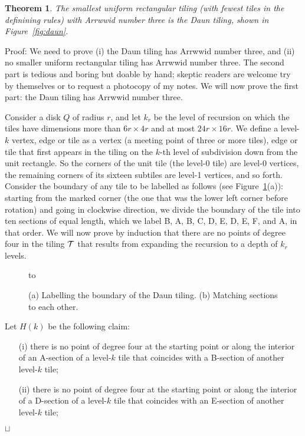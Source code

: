 \documentclass[11pt,a4paper]{article}
\newtheorem{theorem}{Theorem}
\newenvironment{proof}{Proof:}{\qed}
\def\squareforqed{\hbox{\rlap{$\sqcap$}$\sqcup$}}
\def\qed{\ifmmode\squareforqed\else{\unskip\nobreak\hfil
\penalty50\hskip1em\null\nobreak\hfil\squareforqed
\parfillskip=0pt\finalhyphendemerits=0\endgraf}\fi}
\begin{document}
\begin{theorem}\label{th:Dauntiling}
The smallest uniform rectangular tiling (with fewest tiles in the definining rules) with Arrwwid number three is the Daun tiling, shown in Figure~\ref{fig:daun}.
\end{theorem}
\begin{proof}
We need to prove (i) the Daun tiling has Arrwwid number three, and (ii) no smaller uniform rectangular tiling has Arrwwid number three. The second part is tedious and boring but doable by hand; skeptic readers are welcome try by themselves or to request a photocopy of my notes. We will now prove the first part: the Daun tiling has Arrwwid number three.

Consider a disk $Q$ of radius $r$, and let $k_r$ be the level of recursion on which the tiles have dimensions more than $6r \times 4r$ and at most $24r \times 16r$. We define a level-$k$ vertex, edge or tile as a vertex (a meeting point of three or more tiles), edge or tile that first appears in the tiling on the $k$-th level of subdivision down from the unit rectangle. So the corners of the unit tile (the level-0 tile) are level-0 vertices, the remaining corners of its sixteen subtiles are level-1 vertices, and so forth. Consider the boundary of any tile to be labelled as follows (see Figure~\ref{fig:daun-labelling}(a)): starting from the marked corner (the one that was the lower left corner before rotation) and going in clockwise direction, we divide the boundary of the tile into ten sections of equal length, which we label B, A, B, C, D, E, D, E, F, and A, in that order. We will now prove by induction that there are no points of degree four in the tiling ${\cal T}$ that results from expanding the recursion to a depth of $k_r$ levels.
\begin{figure}
\centering
\hbox to
\caption{(a) Labelling the boundary of the Daun tiling. (b) Matching sections to each other.}
\label{fig:daun-labelling}
\end{figure}
Let $H(k)$ be the following claim:\begin{itemize}
\item[(i)] there is no point of degree four at the starting point or along the interior of an A-section of a level-$k$ tile that coincides with a B-section of another level-$k$ tile;
\item[(ii)] there is no point of degree four at the starting point or along the interior of a D-section of a level-$k$ tile that coincides with an E-section of another level-$k$ tile;

\end{itemize}
\end{proof}
\end{document}
